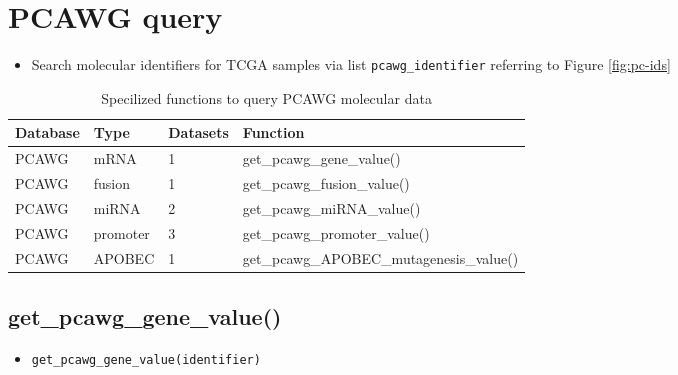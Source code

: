 \documentclass[
]{book}
\newenvironment{Shaded}{\begin{snugshade}}{\end{snugshade}}
\newcommand{\AttributeTok}[1]{\textcolor[rgb]{0.13,0.29,0.53}{#1}}
\newcommand{\FunctionTok}[1]{\textcolor[rgb]{0.13,0.29,0.53}{\textbf{#1}}}
\newcommand{\NormalTok}[1]{#1}
\newcommand{\OtherTok}[1]{\textcolor[rgb]{0.56,0.35,0.01}{#1}}
\newcommand{\SpecialCharTok}[1]{\textcolor[rgb]{0.81,0.36,0.00}{\textbf{#1}}}
\newcommand{\StringTok}[1]{\textcolor[rgb]{0.31,0.60,0.02}{#1}}
\providecommand{\tightlist}{%
  \setlength{\itemsep}{0pt}\setlength{\parskip}{0pt}}
\begin{document}
\section{PCAWG query}\label{pcawg-query}

\begin{itemize}
\tightlist
\item
  Search molecular identifiers for TCGA samples via list \texttt{pcawg\_identifier} referring to Figure \ref{fig:pc-ids}
\end{itemize}

\begin{table}

\caption{\label{tab:query-pcawg-func}Specilized functions to query PCAWG molecular data}
\centering
\begin{tabular}[t]{llll}
\toprule
Database & Type & Datasets & Function\\
\midrule
PCAWG & mRNA & 1 & get\_pcawg\_gene\_value()\\
PCAWG & fusion & 1 & get\_pcawg\_fusion\_value()\\
PCAWG & miRNA & 2 & get\_pcawg\_miRNA\_value()\\
PCAWG & promoter & 3 & get\_pcawg\_promoter\_value()\\
PCAWG & APOBEC & 1 & get\_pcawg\_APOBEC\_mutagenesis\_value()\\
\bottomrule
\end{tabular}
\end{table}

\subsection{get\_pcawg\_gene\_value()}\label{get_pcawg_gene_value}

\begin{itemize}
\tightlist
\item
  \texttt{get\_pcawg\_gene\_value(identifier)}
\end{itemize}

\begin{Shaded}
\end{Shaded}
\end{document}
